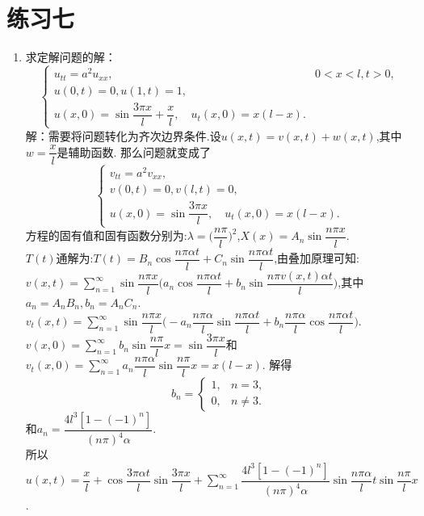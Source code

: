 \documentclass[11pt]{article}
\begin{document}
\setlength{\topmargin}{-18mm}
\section*{练习七}
    \begin{enumerate}
        \item 求定解问题的解：
           \[
        \left\{
         \begin{array}{lr}
         u_{tt}=a^{2}u_{xx},&0<x<l,t>0, \\
         u(0,t)=0,u(1,t)=1, \\
         u(x,0)=\sin \dfrac{3\pi x}{l}+\dfrac{x}{l},\quad u_t(x,0)=x(l-x).
         \end{array}
        \right. \]
            解：需要将问题转化为齐次边界条件.设$u(x,t)=v(x,t)+w(x,t)$,其中$w=\dfrac{x}{l}$是辅助函数.
        那么问题就变成了\[
        \left\{
         \begin{array}{lr}
         v_{tt}=a^{2}v_{xx}, \\
         v(0,t)=0,v(l,t)=0, \\
         u(x,0)=\sin \dfrac{3\pi x}{l},\quad u_t(x,0)=x(l-x).
         \end{array}
        \right. \]
        方程的固有值和固有函数分别为:$\lambda=\big(\dfrac{n\pi}{l}\big)^2$,$X(x)=A_n\sin\dfrac{n\pi x}{l}$.\\$T(t)$通解为:$T(t)=B_n\cos\dfrac{n\pi \alpha t}{l}+C_n\sin\dfrac{n\pi \alpha t}{l}$,由叠加原理可知:\\
        $v(x,t)=\sum\limits_{n=1}^{\infty}\sin\dfrac{n\pi x}{l}\big(a_n\cos\dfrac{n\pi \alpha t}{l}+b_n\sin\dfrac{n\pi v(x,t)\alpha t}{l}\big)$,其中$a_n=A_{n}B_n,b_n=A_{n}C_n$.\\$v_t(x,t)=\sum\limits_{n=1}^{\infty}\sin\dfrac{n\pi x}{l}\big(-a_n\dfrac{n\pi \alpha}{l}\sin\dfrac{n\pi \alpha t}{l}+b_n\dfrac{n\pi \alpha}{l}\cos\dfrac{n\pi \alpha t}{l}\big)$.\\$v(x,0)=\sum\limits_{n=1}^{\infty}b_n\sin\dfrac{n\pi}{l}x=\sin\dfrac{3\pi x}{l}$和$v_t(x,0)=\sum\limits_{n=1}^{\infty}a_n\dfrac{n\pi\alpha}{l}\sin\dfrac{n\pi}{l}x=x(l-x)$.
        解得\[b_n=\begin{cases}
                  1, & n=3,\\
                  0, &n\neq 3.
        \end{cases}\]
        和$a_n=\dfrac{4l^3[1-(-1)^n]}{(n\pi)^4\alpha}$.\\所以$u(x,t)=\dfrac{x}{l}+\cos\dfrac{3\pi\alpha t}{l}\sin\dfrac{3\pi x}{l}+\sum\limits_{n=1}^{\infty}\dfrac{4l^3[1-(-1)^n]}{(n\pi)^4\alpha}\sin\dfrac{n\pi\alpha}{l}t\sin\dfrac{n\pi}{l}x$.




\end{enumerate}
\end{document}
